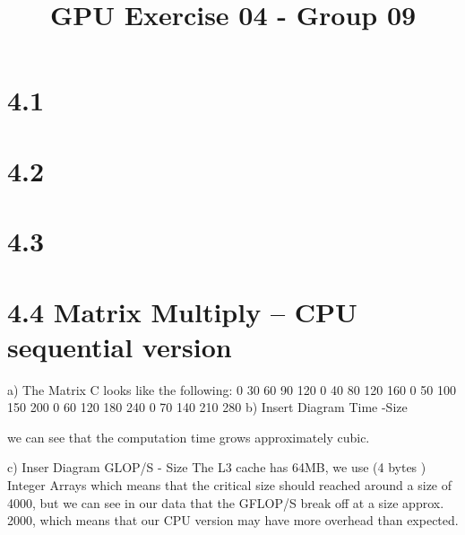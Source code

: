 \documentclass{report}
\begin{document}
\title{GPU Exercise 04 - Group 09}
\maketitle

\section*{4.1}

\section*{4.2}
\section*{4.3}
\section*{4.4 Matrix Multiply – CPU sequential version}
a) The Matrix C looks like the following:
0 30 60 90 120 
0 40 80 120 160 
0 50 100 150 200 
0 60 120 180 240 
0 70 140 210 280 
b)
Insert Diagram Time -Size

we can see that the computation time  grows approximately cubic.

c) 
Inser Diagram GLOP/S - Size
The L3 cache has 64MB, we use (4 bytes ) Integer Arrays which means that the critical size should reached around a size of 4000, but we can see in our data that
the GFLOP/S break off at a size approx. 2000, which means that our CPU version may have more overhead than expected.
\end{document}
